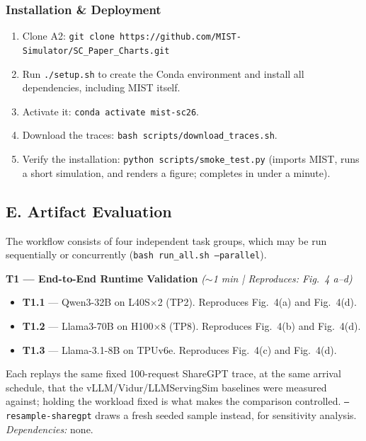 \documentclass[conference]{IEEEtran}
\newcommand{\tool}{{MIST }}
\newcommand{\toolns}{{MIST}}
\begin{document}
\subsubsection*{Installation \& Deployment}

\begin{enumerate}[leftmargin=1.2em]
  \item Clone A2:
        \texttt{git clone https://github.com/MIST-Simulator/SC\_Paper\_Charts.git}
  \item Run \texttt{./setup.sh} to create the Conda environment and
        install all dependencies, including \tool itself.
  \item Activate it: \texttt{conda activate mist-sc26}.
  \item Download the traces:
        \texttt{bash scripts/download\_traces.sh}.
  \item Verify the installation:
        \texttt{python scripts/smoke\_test.py}
        (imports \toolns, runs a short simulation, and renders a figure;
        completes in under a minute).
\end{enumerate}

\subsection*{E. Artifact Evaluation}

The workflow consists of four independent task groups, which may be run
sequentially or concurrently (\texttt{bash run\_all.sh --parallel}).

\medskip
\noindent\textbf{T1 --- End-to-End Runtime Validation}
\hfill\textit{($\sim$1 min | Reproduces: Fig.~4 a--d)}

\begin{itemize}[leftmargin=1.2em, topsep=2pt]
  \item \textbf{T1.1} --- Qwen3-32B on L40S$\times$2 (TP2).
        Reproduces Fig.~4(a) and Fig.~4(d).
  \item \textbf{T1.2} --- Llama3-70B on H100$\times$8 (TP8).
        Reproduces Fig.~4(b) and Fig.~4(d).
  \item \textbf{T1.3} --- Llama-3.1-8B on TPUv6e.
        Reproduces Fig.~4(c) and Fig.~4(d).
\end{itemize}
Each replays the same fixed 100-request ShareGPT trace, at the same
arrival schedule, that the vLLM/Vidur/LLMServingSim baselines were
measured against; holding the workload fixed is what makes the
comparison controlled.  \texttt{--resample-sharegpt} draws a fresh
seeded sample instead, for sensitivity analysis.\\
\textit{Dependencies:} none.
\smallskip
\end{document}
